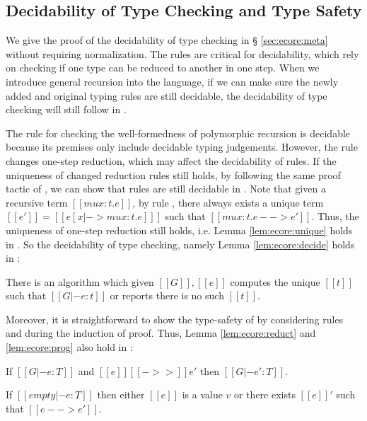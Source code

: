 \subsection{Decidability of Type Checking and Type Safety}
We give the proof of the decidability of type checking \ecore in \S
\ref{sec:ecore:meta} without requiring normalization. The \cast rules
are critical for decidability, which rely on checking if one type can
be reduced to another in one step. When we introduce general recursion
into the language, if we can make sure the newly added and original
typing rules are still decidable, the decidability of type checking
will still follow in \name.

The rule  for checking the well-formedness of
polymorphic recursion is decidable because its premises only include
decidable typing judgements. However, the rule  changes
one-step reduction, which may affect the decidability of \cast
rules. If the uniqueness of changed reduction rules still holds, by
following the same proof tactic of \ecore, we can show that \cast
rules are still decidable in \name. Note that given a recursive term
$[[mu x:t.e]]$, by rule , there always exists a unique
term $[[e']]=[[e[x|->mu x:t.e] ]]$ such that $[[mu x:t.e -->
    e']]$. Thus, the uniqueness of one-step reduction still holds,
i.e. Lemma \ref{lem:ecore:unique} holds in \name. So the decidability
of type checking, namely Lemma \ref{lem:ecore:decide} holds in \name:

\begin{thm}\label{lem:rec:decide}
	There is an algorithm which given $[[G]], [[e]]$ computes the unique
$[[t]]$ such that $[[G |- e:t]]$ or reports there is no such $[[t]]$.
\end{thm}

Moreover, it is straightforward to show the type-safety of \name by
considering rules  and  during the
induction of proof. Thus, Lemma \ref{lem:ecore:reduct} and \ref{lem:ecore:prog}
also hold in \name:

\begin{thm}\label{lem:rec:reduct}
If $[[G |- e:T]]$ and $[[e]] [[->>]] e'$ then $[[G |- e':T]]$.
\end{thm}

\begin{thm}[Progress]\label{lem:rec:prog}
If $[[empty |- e:T]]$ then either $[[e]]$ is a value $v$ or there exists $[[e]]'$
such that $[[e --> e']]$.
\end{thm}
